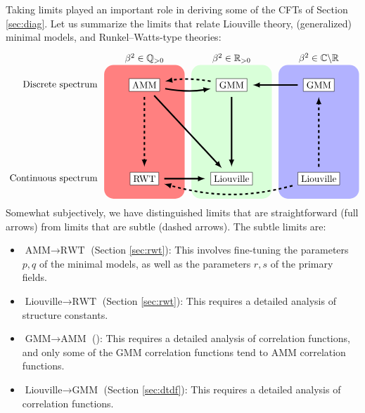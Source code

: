\documentclass[12pt, a4paper]{article}
\theoremstyle{break}
\begin{document}
Taking limits played an important role in deriving some of the CFTs of Section \ref{sec:diag}. 
Let us summarize the limits that relate Liouville theory, (generalized) minimal models, and Runkel--Watts-type theories: 
\begin{align}
\begin{tikzpicture}[scale = .25, baseline=(current  bounding  box.center)]
\fill[red!50, rounded corners = 10] (-6, -10) rectangle (6, 10);
\fill[green!15, rounded corners = 10] (7, -10) rectangle (19, 10);
\fill[blue!30, rounded corners = 10] (20, -10) rectangle (32, 10);
\node at (0, 11) {$\beta^2\in\mathbb{Q}_{>0}$};
\node at (13, 11) {$\beta^2\in\mathbb{R}_{>0}$};
\node at (26, 11) {$\beta^2\in \mathbb{C}\backslash \mathbb{R}$};
\node[left] at (-6.5, 7) {Discrete spectrum};
\node[left] at (-6.5, -7) {Continuous spectrum};
\draw (0, 7) node[draw, fill = white] (mm) {AMM};
\draw (13, 7) node[draw, fill = white] (gmm1) {GMM};
\draw (26, 7) node[draw, fill = white] (gmm2) {GMM};
\draw (0, -7) node[draw, fill = white] (rwt) {RWT};
\draw (13, -7) node[draw, fill = white] (clo) {Liouville};
\draw (26, -7) node[draw, fill = white] (liou) {Liouville};
\draw [ultra thick, shorten <= 2mm, shorten >= 2mm, -latex, 
       out = -10, in = -170] (mm) to (gmm1);
\draw [ultra thick, shorten <= 2mm, shorten >= 2mm, -latex, dashed,
       out = 170, in = 10] (gmm1) to (mm);
\draw [ultra thick, shorten <= 2mm, shorten >= 2mm, -latex] (gmm2) to (gmm1);
\draw [ultra thick, shorten <= 2mm, shorten >= 2mm, -latex] (mm) to (clo);
\draw [ultra thick, shorten <= 2mm, shorten >= 2mm, -latex, dashed] (mm) to (rwt);
\draw [ultra thick, shorten <= 2mm, shorten >= 2mm, -latex] (rwt) to (clo);
\draw [ultra thick, shorten <= 2mm, shorten >= 2mm, -latex] (gmm1) to (clo);
\draw [ultra thick, shorten <= 2mm, shorten >= 2mm, -latex,
       out = -165, in = -15, dashed] (liou) to (rwt);
\draw [ultra thick, shorten <= 2mm, shorten >= 2mm, -latex, dashed] (liou) to (gmm2);
\end{tikzpicture}
\label{lims}
\end{align}
Somewhat subjectively, we have distinguished limits that are straightforward (full arrows) from limits that are subtle (dashed arrows). The subtle limits are:
\begin{itemize}
 \item $\boxed{\text{AMM}\to \text{RWT}}$ (Section \ref{sec:rwt}): This involves fine-tuning the parameters $p,q$ of the minimal models, as well as the parameters $r,s$ of the primary fields.
  \item $\boxed{\text{Liouville}\to \text{RWT}}$ (Section \ref{sec:rwt}): This requires a detailed analysis of structure constants. 
 \item $\boxed{\text{GMM}\to \text{AMM}}$ (\cite{rib18}): This requires a detailed analysis of correlation functions, and only some of the GMM correlation functions tend to AMM correlation functions. 
 \item $\boxed{\text{Liouville}\to \text{GMM}}$ (Section \ref{sec:dtdf}): This requires a detailed analysis of correlation functions.
\end{itemize}
\end{document}
